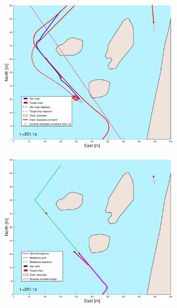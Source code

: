 \begin{figure}[ht]\ContinuedFloat
    \begin{subfigure}[b]{0.49\textwidth}
        \centering
        \includegraphics[width=\textwidth]{Images/Figures/Helloya_Rev/_Simple_1fig1_time=201}
    \end{subfigure}
    \hfill
    \begin{subfigure}[b]{0.499\textwidth}
        \centering
        \includegraphics[width=\textwidth]{Images/Figures/Helloya_Rev/_Simple_1fig999_time=201}

\end{subfigure}
\end{figure}
